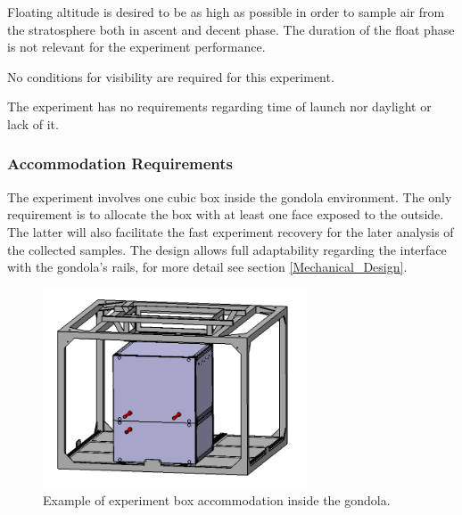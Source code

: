 Floating altitude is desired to be as high as possible in order to sample air from the stratosphere both in ascent and decent phase. The duration of the float phase is not relevant for the experiment performance. 

\smallskip
No conditions for visibility are required for this experiment.

\smallskip
The experiment has no requirements regarding time of launch nor daylight or lack of it. 

\pagebreak
\subsubsection{Accommodation Requirements}

The experiment involves one cubic box inside the gondola environment. The only requirement is to allocate the box with at least one face exposed to the outside. The latter will also facilitate the fast experiment recovery for the later analysis of the collected samples. The design allows full adaptability regarding the interface with the gondola's rails, for more detail see section \ref{Mechanical_Design}. 

\begin{figure}[!ht]
    \centering
    \includegraphics[width=0.7\textwidth]{6-launch-campaign-preparation/img/gondola_accommodation.jpg}
    \caption{Example of experiment box accommodation inside the gondola.}
    \label{goldola_accommodation}
\end{figure}